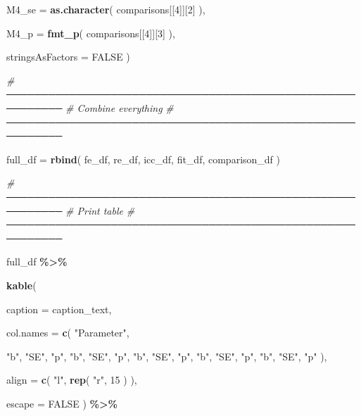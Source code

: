 \documentclass[
]{article}
\newenvironment{Shaded}{\begin{snugshade}}{\end{snugshade}}
\newcommand{\AttributeTok}[1]{\textcolor[rgb]{0.13,0.29,0.53}{#1}}
\newcommand{\CommentTok}[1]{\textcolor[rgb]{0.56,0.35,0.01}{\textit{#1}}}
\newcommand{\ConstantTok}[1]{\textcolor[rgb]{0.56,0.35,0.01}{#1}}
\newcommand{\DecValTok}[1]{\textcolor[rgb]{0.00,0.00,0.81}{#1}}
\newcommand{\FunctionTok}[1]{\textcolor[rgb]{0.13,0.29,0.53}{\textbf{#1}}}
\newcommand{\NormalTok}[1]{#1}
\newcommand{\OtherTok}[1]{\textcolor[rgb]{0.56,0.35,0.01}{#1}}
\newcommand{\SpecialCharTok}[1]{\textcolor[rgb]{0.81,0.36,0.00}{\textbf{#1}}}
\newcommand{\StringTok}[1]{\textcolor[rgb]{0.31,0.60,0.02}{#1}}
\begin{document}
\begin{Shaded}
\begin{Highlighting}[]
      \AttributeTok{M4\_se =}
        \FunctionTok{as.character}\NormalTok{(}
\NormalTok{          comparisons[[}\DecValTok{4}\NormalTok{]][}\DecValTok{2}\NormalTok{]}
\NormalTok{        ),}

      \AttributeTok{M4\_p =}
        \FunctionTok{fmt\_p}\NormalTok{(}
\NormalTok{          comparisons[[}\DecValTok{4}\NormalTok{]][}\DecValTok{3}\NormalTok{]}
\NormalTok{        ),}

      \AttributeTok{stringsAsFactors =} \ConstantTok{FALSE}
\NormalTok{    )}


  \CommentTok{\# ──────────────────────────────────────────────────────────}
  \CommentTok{\# Combine everything}
  \CommentTok{\# ──────────────────────────────────────────────────────────}

\NormalTok{  full\_df }\OtherTok{=}
    \FunctionTok{rbind}\NormalTok{(}
\NormalTok{      fe\_df,}
\NormalTok{      re\_df,}
\NormalTok{      icc\_df,}
\NormalTok{      fit\_df,}
\NormalTok{      comparison\_df}
\NormalTok{    )}


  \CommentTok{\# ──────────────────────────────────────────────────────────}
  \CommentTok{\# Print table}
  \CommentTok{\# ──────────────────────────────────────────────────────────}

\NormalTok{  full\_df }\SpecialCharTok{\%\textgreater{}\%}

    \FunctionTok{kable}\NormalTok{(}

      \AttributeTok{caption =}
\NormalTok{        caption\_text,}

      \AttributeTok{col.names =}
        \FunctionTok{c}\NormalTok{(}
          \StringTok{"Parameter"}\NormalTok{,}

          \StringTok{"b"}\NormalTok{, }\StringTok{"SE"}\NormalTok{, }\StringTok{"p"}\NormalTok{,}
          \StringTok{"b"}\NormalTok{, }\StringTok{"SE"}\NormalTok{, }\StringTok{"p"}\NormalTok{,}
          \StringTok{"b"}\NormalTok{, }\StringTok{"SE"}\NormalTok{, }\StringTok{"p"}\NormalTok{,}
          \StringTok{"b"}\NormalTok{, }\StringTok{"SE"}\NormalTok{, }\StringTok{"p"}\NormalTok{,}
          \StringTok{"b"}\NormalTok{, }\StringTok{"SE"}\NormalTok{, }\StringTok{"p"}
\NormalTok{        ),}

      \AttributeTok{align =}
        \FunctionTok{c}\NormalTok{(}
          \StringTok{"l"}\NormalTok{,}
          \FunctionTok{rep}\NormalTok{(}
            \StringTok{"r"}\NormalTok{,}
            \DecValTok{15}
\NormalTok{          )}
\NormalTok{        ),}

      \AttributeTok{escape =} \ConstantTok{FALSE}
\NormalTok{    ) }\SpecialCharTok{\%\textgreater{}\%}


\end{Highlighting}
\end{Shaded}
\end{document}
